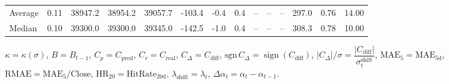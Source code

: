 \begin{threeparttable}
{\begin{tabular}{lrrrrrrrrrrrrr}
Average &     0.11 & 38947.2 & 38954.2 & 39057.7 &     -103.4 &                     -0.4 &                 0.4 &         -- &        -- &             -- &            297.0 &            0.76 &                  14.00 \\
 Median &     0.10 & 39300.0 & 39300.0 & 39345.0 &     -142.5 &                     -1.0 &                 0.4 &         -- &        -- &             -- &            308.3 &            0.78 &                  10.00 \\
\bottomrule
\end{tabular}
}
\begin{tablenotes}\footnotesize
\item $\kappa=\kappa(\sigma)$, $B=B_{t-1}$, $C_p=C_{\text{pred}}$, $C_r=C_{\text{real}}$, $C_\Delta=C_{\text{diff}}$, $\mathrm{sgn}\,C_\Delta=\operatorname{sign}(C_{\text{diff}})$, $|C_\Delta|/\sigma=\dfrac{|C_{\text{diff}}|}{\sigma_t^{\text{shift}}}$, $\mathrm{MAE}_5=\mathrm{MAE}_{5\text{d}}$, $\mathrm{RMAE}= \mathrm{MAE}_5 / \text{Close}$, $\mathrm{HR}_{20}=\mathrm{HitRate}_{20\text{d}}$, 
$\lambda_{\text{shift}}=\lambda_t$, 
$\Delta\alpha_t=\alpha_t-\alpha_{t-1}$.
\end{tablenotes}
\end{threeparttable}
\endgroup

